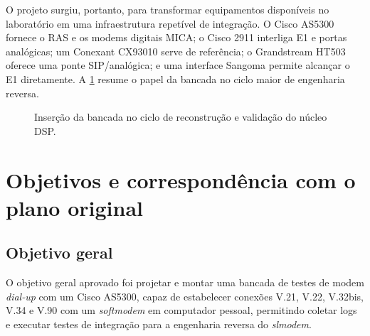 \documentclass[12pt,a4paper]{article}
\newcommand{\slmodem}{\textit{slmodem}}
\newcommand{\dsplibs}{\texttt{dsplibs.o}}
\begin{document}
O projeto surgiu, portanto, para transformar equipamentos disponíveis no laboratório
em uma infraestrutura repetível de integração. O Cisco AS5300 fornece o RAS e os
modems digitais MICA; o Cisco 2911 interliga E1 e portas analógicas; um Conexant
CX93010 serve de referência; o Grandstream HT503 oferece uma ponte SIP/analógica; e
uma interface Sangoma permite alcançar o E1 diretamente. A \cref{fig:ciclo-pesquisa}
resume o papel da bancada no ciclo maior de engenharia reversa.

\begin{figure}[htbp]
\centering
{}
\caption{Inserção da bancada no ciclo de reconstrução e validação do núcleo DSP.}
\label{fig:ciclo-pesquisa}
\end{figure}

\section{Objetivos e correspondência com o plano original}

\subsection{Objetivo geral}

O objetivo geral aprovado foi projetar e montar uma bancada de testes de modem
\emph{dial-up} com um Cisco AS5300, capaz de estabelecer conexões V.21, V.22,
V.32bis, V.34 e V.90 com um \emph{softmodem} em computador pessoal, permitindo
coletar logs e executar testes de integração para a engenharia reversa do
\slmodem{}.
\end{document}

